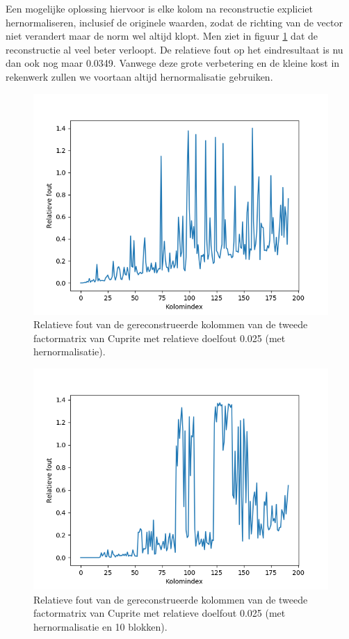 Een mogelijke oplossing hiervoor is elke kolom na reconstructie expliciet hernormaliseren, inclusief de originele waarden, zodat de richting van de vector niet verandert maar de norm wel altijd klopt. Men ziet in figuur \ref{fig:orthogonality-compression-renormalization} dat de reconstructie al veel beter verloopt. De relatieve fout op het eindresultaat is nu dan ook nog maar 0.0349. Vanwege deze grote verbetering en de kleine kost in rekenwerk zullen we voortaan altijd hernormalisatie gebruiken.

\begin{figure}[]
  \centering
  \includegraphics[scale=0.7]{images/orthogonality_compression_renormalization.png}
  \caption{Relatieve fout van de gereconstrueerde kolommen van de tweede factormatrix van Cuprite met relatieve doelfout 0.025 (met hernormalisatie).}
\label{fig:orthogonality-compression-renormalization}
\end{figure}

\begin{figure}[]
  \centering
  \includegraphics[scale=0.7]{images/orthogonality_compression_blocks.png}
  \caption{Relatieve fout van de gereconstrueerde kolommen van de tweede factormatrix van Cuprite met relatieve doelfout 0.025 (met hernormalisatie en 10 blokken).}
\label{fig:orthogonality-compression-blocks}
\end{figure}

